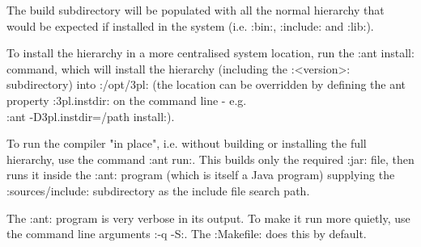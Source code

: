 The build subdirectory will be populated with all the normal hierarchy that
would be expected if installed in the system (i.e. \bverb:bin:, \bverb:include:
and \bverb:lib:).

To install the hierarchy in a more centralised system location, run the
\bverb:ant install: command, which will install the hierarchy (including
the \bverb:<version>: subdirectory) into \bverb:/opt/3pl: (the location can
be overridden by defining the ant property \bverb:3pl.instdir: on the command
line - e.g. \\ \bverb:ant -D3pl.instdir=/path install:).

To run the compiler "in place", i.e. without building or installing the
full hierarchy, use the command \bverb:ant run:. This builds only the
required \bverb:jar: file, then runs it inside the \bverb:ant: program
(which is itself a Java program) supplying the \bverb:sources/include:
subdirectory as the include file search path.

The \bverb:ant: program is very verbose in its output. To make it run more
quietly, use the command line arguments \bverb:-q -S:. The \bverb:Makefile:
does this by default.
